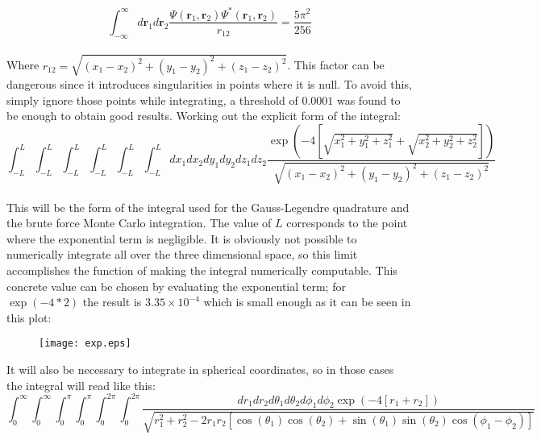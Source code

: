 \documentclass[11pt,a4paper,oneside]{article}
\begin{document}
		\begin{equation*}\int_{-\infty}^\infty{d\boldsymbol{r}_1d\boldsymbol{r}_2\frac{\Psi\left(\boldsymbol{r}_1,\boldsymbol{r}_2\right)\Psi^*\left(\boldsymbol{r}_1,\boldsymbol{r}_2\right)}{r_{12}}}=\frac{5\pi^2}{256}\end{equation*}\\
		
		Where $r_{12}=\sqrt{\left(x_1-x_2\right)^2+\left(y_1-y_2\right)^2+\left(z_1-z_2\right)^2}$. This factor can be dangerous since it introduces singularities in points where it is null. To avoid this, simply ignore those points while integrating, a threshold of $0.0001$ was found to be enough to obtain good results. Working out the explicit form of the integral:\\
		
		\begin{equation*}\int_{-L}^L\int_{-L}^L\int_{-L}^L\int_{-L}^L\int_{-L}^L\int_{-L}^L{dx_1dx_2dy_1dy_2dz_1dz_2\frac{\exp{\left(-4\left[\sqrt{x_1^2+y_1^2+z_1^2}+\sqrt{x_2^2+y_2^2+z_2^2}\right]\right)}}{\sqrt{\left(x_1-x_2\right)^2+\left(y_1-y_2\right)^2+\left(z_1-z_2\right)^2}}}\end{equation*}\\
		
		This will be the form of the integral used for the Gauss-Legendre quadrature and the brute force Monte Carlo integration. The value of $L$ corresponds to the point where the exponential term is negligible. It is obviously not possible to numerically integrate all over the three dimensional space, so this limit accomplishes the function of making the integral numerically computable. This concrete value can be chosen by evaluating the exponential term; for $\exp{\left(-4*2\right)}$ the result is $3.35\times10^{-4}$ which is small enough as it can be seen in this plot:\\
		
		\begin{figure}[ht!]\begin{center}\texttt{[image: exp.eps]}\par\end{center}\protect\end{figure}
		
		It will also be necessary to integrate in spherical coordinates, so in those cases the integral will read like this:\\
		
		\small\begin{equation*}\int_0^\infty\int_0^\infty\int_0^\pi\int_0^\pi\int_0^{2\pi}\int_0^{2\pi}{\frac{dr_1dr_2d\theta_1d\theta_2d\phi_1d\phi_2\exp{\left(-4\left[r_1+r_2\right]\right)}}{\sqrt{r_1^2+r_2^2-2r_1r_2\left[\cos{\left(\theta_1\right)}\cos{\left(\theta_2\right)}+\sin{\left(\theta_1\right)}\sin{\left(\theta_2\right)}\cos{\left(\phi_1-\phi_2\right)}\right]}}}\end{equation*}\normalsize\\
		
\end{document}
